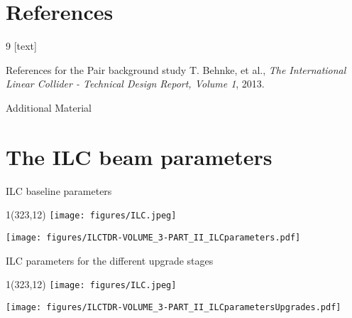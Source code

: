 \documentclass[xcolor={dvipsnames}]{beamer}
\newcommand{\ilclogo}{
  \setlength{\TPHorizModule}{1pt}
  \setlength{\TPVertModule}{1pt}
  \begin{textblock}{1}(323,12)
   \texttt{[image: figures/ILC.jpeg]}
  \end{textblock}
}
\begin{document}
\section*{References}
\begin{thebibliography}{9}
[text]
\begin{frame}{References for the Pair background study}
\tiny
{}
 T. Behnke, et al., \emph{The International Linear Collider - Technical Design Report, Volume 1}, 2013.
\end{frame}
\end{thebibliography}

\appendix

\begin{frame}
\begin{center}
\LARGE Additional Material
\end{center}
\end{frame}

\section{The ILC beam parameters}
\begin{frame}{ILC baseline parameters}
\ilclogo
\begin{center}
	\texttt{[image: figures/ILCTDR-VOLUME\_3-PART\_II\_ILCparameters.pdf]}
\end{center}
\end{frame}
\begin{frame}{ILC parameters for the different upgrade stages}
\ilclogo
\begin{center}
	\texttt{[image: figures/ILCTDR-VOLUME\_3-PART\_II\_ILCparametersUpgrades.pdf]}
\end{center}
\end{frame}
\end{document}
